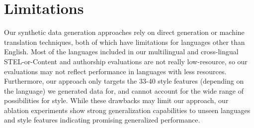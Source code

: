 \section * {Limitations}

Our synthetic data generation approaches rely on direct generation or machine translation techniques, both of which have limitations for languages other than English. Most of the languages included in our multilingual and cross-lingual STEL-or-Content and authorship evaluations are not really low-resource, so our evaluations may not  reflect performance in languages  with less resources. Furthermore, our approach  only targets the 33-40 style features (depending on the language) we generated data for, and cannot account for the  wide range of possibilities for style. While these drawbacks may limit our approach, our ablation experiments show strong generalization capabilities to unseen languages and style features indicating promising generalized performance.